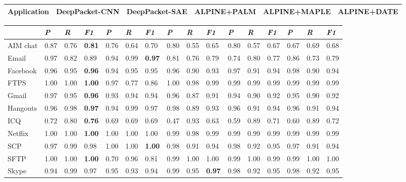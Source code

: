 \begin{table} [ht!]
\begin{tabular} {|p{2cm}|p{2.3cm}|p{2.3cm}|p{2.3cm}|p{2.4cm}|p{2.4cm}|}
\hline
\textbf{Application} & DeepPacket-CNN & DeepPacket-SAE & ALPINE+PALM & ALPINE+MAPLE & ALPINE+DATE \\
\hline
\end{tabular}
\begin{tabular} {|p{2cm}|p{0.5cm}p{0.5cm}p{0.5cm}|p{0.5cm}p{0.5cm}p{0.5cm}|p{0.5cm}p{0.5cm}p{0.5cm}|p{0.5cm}p{0.5cm}p{0.5cm}|p{0.5cm}p{0.5cm}p{0.5cm}|}
\hline
& \textit{P} & \textit{R} & \textit{F1} & \textit{P} & \textit{R} & \textit{F1} & \textit{P} & \textit{R} & %
\textit{F1} & \textit{P} & \textit{R} & \textit{F1} & \textit{P} & \textit{R} & \textit{F1} \\
\hline
AIM chat & 0.87 & 0.76 & \textbf{0.81} & 0.76 & 0.64 & 0.70 & 0.80 & 0.55 & 0.65 & 0.80 & 0.57 & 0.67 & 0.67 & 0.69 & 0.68 \\
Email & 0.97 & 0.82 & 0.89 & 0.94 & 0.99 & \textbf{0.97} & 0.81 & 0.76 & 0.79 & 0.74 & 0.80 & 0.77 & 0.86 & 0.73 & 0.79 \\
Facebook & 0.96 & 0.95 & \textbf{0.96} & 0.94 & 0.95 & 0.95 & 0.96 & 0.90 & 0.93 & 0.97 & 0.91 & 0.94 & 0.98 & 0.90 & 0.94 \\
FTPS & 1.00 & 1.00 & \textbf{1.00} & 0.97 & 0.77 & 0.86 & 1.00 & 0.98 & 0.99 & 0.99 & 0.99 & 0.99 & 0.99 & 0.99 & 0.99 \\
Gmail & 0.97 & 0.95 & \textbf{0.96} & 0.93 & 0.94 & 0.94 & 0.96 & 0.87 & 0.91 & 0.94 & 0.90 & 0.92 & 0.95 & 0.90 & 0.92 \\
Hangouts & 0.96 & 0.98 & \textbf{0.97} & 0.94 & 0.99 & 0.97 & 0.98 & 0.89 & 0.93 & 0.96 & 0.91 & 0.94 & 0.96 & 0.91 & 0.94 \\
ICQ & 0.72 & 0.80 & \textbf{0.76} & 0.69 & 0.69 & 0.69 & 0.47 & 0.93 & 0.63 & 0.59 & 0.89 & 0.71 & 0.60 & 0.89 & 0.72 \\
Netflix & 1.00 & 1.00 & \textbf{1.00} & 1.00 & 1.00 & 1.00 & 0.99 & 0.98 & 0.99 & 0.99 & 0.99 & 0.99 & 0.99 & 0.99 & 0.99 \\
SCP & 0.97 & 0.99 & 0.98 & 1.00 & 1.00 & \textbf{1.00} & 0.98 & 0.91 & 0.94 & 0.98 & 0.92 & 0.95 & 0.97 & 0.91 & 0.94 \\
SFTP & 1.00 & 1.00 & \textbf{1.00} & 0.70 & 0.96 & 0.81 & 0.99 & 1.00 & 1.00 & 0.99 & 1.00 & 0.99 & 0.99 & 1.00 & 1.00 \\
Skype & 0.94 & 0.99 & 0.97 & 0.95 & 0.93 & 0.94 & 0.99 & 0.95 & \textbf{0.97} & 0.98 & 0.92 & 0.95 & 0.98 & 0.92 & 0.95 \\

\end{tabular}
\end{table}
